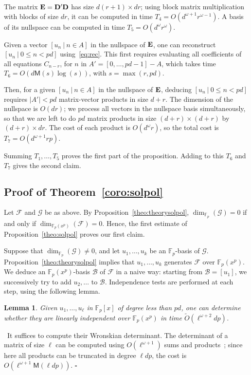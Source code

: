 \documentclass{sig-alternate}
\newcommand{\bigOsoft}{\tilde{O}}
\def\F {\mathbb{F}}
\def\M{\ensuremath{\mathsf{M}}}
\def\mD {\ensuremath{{\bf D}}}
\def\mE {\ensuremath{{\bf E}}}
\def\myproof{\noindent{\sc Proof.}~}
\def\foorp{\hfill$\square$}
\newtheorem{Lemma}{Lemma}
\begin{document}
The matrix $\mE=\mD'\mD$ has size $d(r+1) \times dr$; using block
matrix multiplication with blocks of size $dr$, it can be computed in
time $T_4=O(d^{\omega+1}r^{\omega-1})$. A basis of its nullspace can
be computed in time $T_5=O(d^\omega r^\omega)$.

Given a vector $[u_n \ | \ n\in A]$ in the nullspace of $\mE$, one can
reconstruct $[u_n \ | \ 0 \le n < pd]$ using~\eqref{eq:rec}. This
first requires evaluating all coefficients of all equations $C_{n-r}$,
for $n$ in $A'=[0,\dots,pd-1]-A$, which takes time $T_6=O(d 
\M(s)\log(s))$, with $s=\max(r,pd)$. 

Then, for a given $[u_n \ | \ n\in A]$ in the nullspace of $\mE$,
deducing $[u_n \ | \ 0 \le n < pd]$ requires $|A'|< pd$ matrix-vector
products in size $d+r$. The dimension of the nullspace is $O(dr)$; we
process all vectors in the nullspace basis simultaneously, so that we
are left to do $pd$ matrix products in size $(d+r) \times (d+r)$ by
$(d+r) \times dr$. The cost of each product is $O(d^\omega r)$, so the
total cost is $T_7=O(d^{\omega+1} r p)$.

Summing $T_1,\dots,T_5$ proves the first part of the
proposition. Adding to this $T_6$ and $T_7$ gives the second claim.



\subsection{Proof of Theorem~\ref{coro:solpol}}
 
\noindent Let $\mathcal{F}$ and $\mathcal{G}$ be as above. By
Proposition~\ref{theo:theorysolpol}, $\dim_{\F_p}(\mathcal{G})=0$ if and
only if $\dim_{\F_p(x^p)}(\mathcal{F})=0$. Hence, the first estimate
of Proposition~\ref{theo:solpol} proves our first claim.

Suppose that $\dim_{\F_p}(\mathcal{G})\ne 0$, and let $u_1,\dots,u_k$
be an $\F_p$-basis of $\mathcal{G}$.
Proposition~\ref{theo:theorysolpol} implies that $u_1,\dots,u_k$
generates $\mathcal{F}$ over $\F_p(x^p)$.  We deduce an $\F_p(x^p)$-basis
$\mathscr{B}$ of $\mathcal{F}$ in a naive way: starting from
$\mathscr{B}=[u_1]$, we successively try to add $u_2,\dots$ to
$\mathscr{B}$. Independence tests are performed at each step, using
the following lemma.

\begin{Lemma}
  Given $u_1,\dots,u_\ell$ in $\F_p[x]$ of degree less than $pd$, one
  can determine whether they are linearly independent over $\F_p(x^p)$
  in time $\bigOsoft(\ell^{\omega+2} dp)$.
\end{Lemma}
\myproof It suffices to compute their Wronskian determinant. The
determinant of a matrix of size $\ell$ can be computed using
$O(\ell^{\omega+1})$ sums and products~\cite{Berkowitz84}; since here
all products can be truncated in degree $\ell dp$, the cost is
$O(\ell^{\omega+1} \M(\ell dp))$. \foorp
\end{document}
